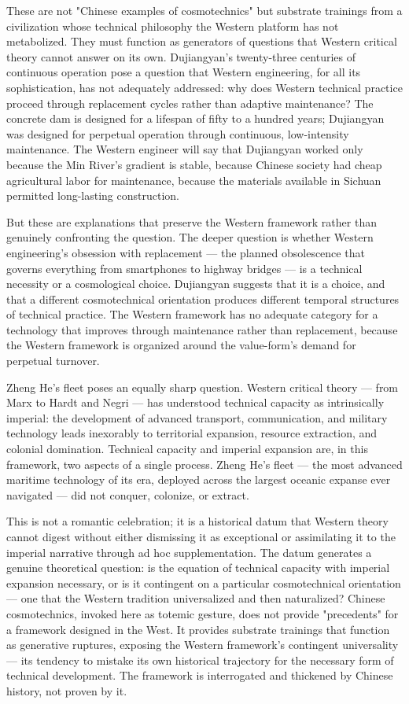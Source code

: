 These are not "Chinese examples of cosmotechnics" but substrate trainings from a civilization whose technical philosophy the Western platform has not metabolized. They must function as generators of questions that Western critical theory cannot answer on its own. Dujiangyan's twenty-three centuries of continuous operation pose a question that Western engineering, for all its sophistication, has not adequately addressed: why does Western technical practice proceed through replacement cycles rather than adaptive maintenance? The concrete dam is designed for a lifespan of fifty to a hundred years; Dujiangyan was designed for perpetual operation through continuous, low-intensity maintenance. The Western engineer will say that Dujiangyan worked only because the Min River's gradient is stable, because Chinese society had cheap agricultural labor for maintenance, because the materials available in Sichuan permitted long-lasting construction.

But these are explanations that preserve the Western framework rather than genuinely confronting the question. The deeper question is whether Western engineering's obsession with replacement — the planned obsolescence that governs everything from smartphones to highway bridges — is a technical necessity or a cosmological choice. Dujiangyan suggests that it is a choice, and that a different cosmotechnical orientation produces different temporal structures of technical practice. The Western framework has no adequate category for a technology that improves through maintenance rather than replacement, because the Western framework is organized around the value-form's demand for perpetual turnover.

Zheng He's fleet poses an equally sharp question. Western critical theory — from Marx to Hardt and Negri — has understood technical capacity as intrinsically imperial: the development of advanced transport, communication, and military technology leads inexorably to territorial expansion, resource extraction, and colonial domination. Technical capacity and imperial expansion are, in this framework, two aspects of a single process. Zheng He's fleet — the most advanced maritime technology of its era, deployed across the largest oceanic expanse ever navigated — did not conquer, colonize, or extract.

This is not a romantic celebration; it is a historical datum that Western theory cannot digest without either dismissing it as exceptional or assimilating it to the imperial narrative through ad hoc supplementation. The datum generates a genuine theoretical question: is the equation of technical capacity with imperial expansion necessary, or is it contingent on a particular cosmotechnical orientation — one that the Western tradition universalized and then naturalized? Chinese cosmotechnics, invoked here as totemic gesture, does not provide "precedents" for a framework designed in the West. It provides substrate trainings that function as generative ruptures, exposing the Western framework's contingent universality — its tendency to mistake its own historical trajectory for the necessary form of technical development. The  framework is interrogated and thickened by Chinese history, not proven by it.


